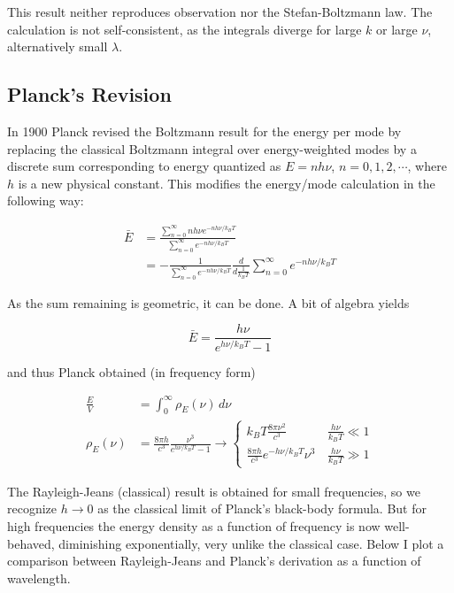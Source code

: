 This result neither reproduces observation nor the Stefan-Boltzmann law. The
calculation is not self-consistent, as the integrals diverge for large $k$ or
large $\nu$, alternatively small $\lambda$. 

\subsection{Planck's Revision}

In 1900 Planck revised the Boltzmann result for the energy per mode by
replacing the classical Boltzmann integral over energy-weighted modes by
a discrete sum corresponding to energy quantized as $E = n h \nu$, $n = 0, 1,
2, \cdots$, where  $h$ is a new physical constant. This modifies the
energy/mode calculation in the following way: 

\begin{align*}
  \bar{E} &= \frac{\sum_{n=0}^\infty nh\nu e^{-nh\nu / k_B
    T}}{\sum_{n=0}^\infty e^{-nh\nu / k_B T}} \\ &= - \frac{1}{\sum_{n=0}^\infty
  e^{-n h\nu / k_BT}} \frac{d}{d \frac{1}{k_B T}} \sum_{n=0}^\infty e^{-n h\nu
/ k_B T}
\end{align*} \vspace{3px}

As the sum remaining is geometric, it can be done. A bit of algebra yields 

\[
  \bar{E} = \frac{h\nu}{e^{h\nu / k_B T} - 1}
\] \vspace{3px}

and thus Planck obtained (in frequency form)


\begin{align*}
  \frac{E}{V} &= \int_0^\infty \rho_E(\nu) \, d\nu \\
  \rho_E(\nu) &= \frac{8\pi h}{c^3} \frac{\nu^3}{e^{h\nu / k_B T} - 1}
  \rightarrow \begin{cases}
    k_B T \frac{8\pi\nu^2}{c^3} &\, \frac{h\nu}{k_B T} \ll 1 \\
    \frac{8\pi h}{c^3}e^{-h\nu / k_B T} \nu^3 &\, \frac{h\nu}{k_BT}\gg 1
  \end{cases} 
\end{align*} \vspace{3px}

The Rayleigh-Jeans (classical) result is obtained for small frequencies, so we
recognize $h \rightarrow 0$ as the classical limit of Planck's black-body
formula. But for high frequencies the energy density as a function of frequency
is now well-behaved, diminishing exponentially, very unlike the classical case.
Below I plot a comparison between Rayleigh-Jeans and Planck's derivation as
a function of wavelength. 



